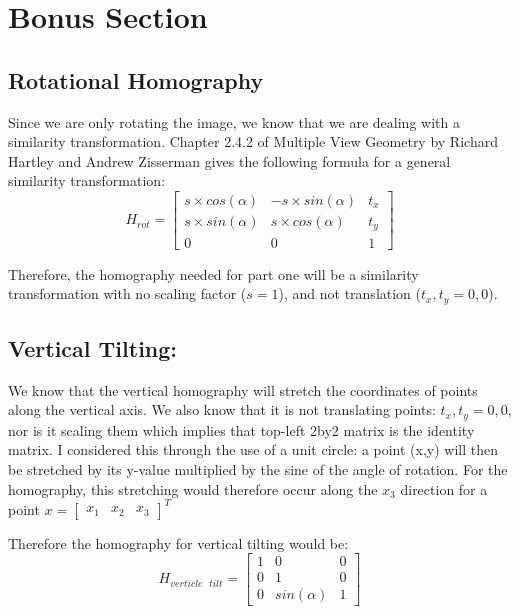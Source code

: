 \documentclass{article}
\begin{document}

\section{Bonus Section}
\subsection{Rotational Homography}
Since we are only rotating the image, we know that we are dealing with a similarity transformation. Chapter 2.4.2 of Multiple View Geometry by Richard Hartley and Andrew Zisserman gives the following formula for a general similarity transformation:
\[H_{rot} = \begin{bmatrix}
    s \times cos(\alpha) & -s \times sin(\alpha) & t_x \\
    s \times sin(\alpha) & s \times cos(\alpha) & t_y \\
    0 & 0 & 1
\end{bmatrix}\]

Therefore, the homography needed for part one will be a similarity transformation with no scaling factor ($s=1$), and not translation ($t_x, t_y = 0,0$).
\subsection{Vertical Tilting:}
We know that the vertical homography will stretch the coordinates of points along the vertical axis. We also know that it is not translating points: $t_x, t_y = 0,0$, nor is it scaling them which implies that top-left 2by2 matrix is the identity matrix. I considered this through the use of a unit circle: a point (x,y) will then be stretched by its y-value multiplied by the sine of the angle of rotation. For the homography, this stretching would therefore occur along the $x_3$ direction for a point $x = \begin{bmatrix}
    x_1 & x_2 & x_3
\end{bmatrix}^T$

Therefore the homography for vertical tilting would be:
\[H_{verticle \text{ } tilt} = \begin{bmatrix}
    1 & 0 & 0 \\
    0 & 1 & 0 \\
    0 & sin(\alpha) & 1
\end{bmatrix}\]
\end{document}
